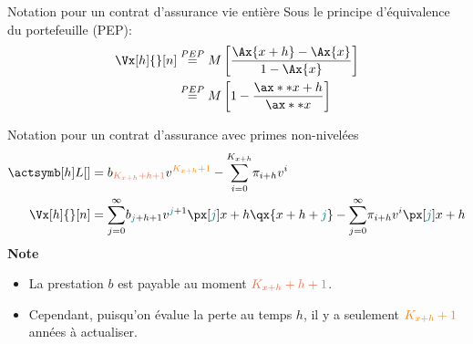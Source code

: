 \documentclass[10pt, french]{article}
\begin{document}
\begin{multicols*}{2}
\begin{examplebox}{Notation pour un contrat d'assurance vie entière}
Sous le principe d'équivalence du portefeuille (PEP):
\begin{align*}
	\Vx[h]{}[n]
	&\overset{PEP}{=}	M\left[\frac{\Ax{x + h} - \Ax{x}}{1 - \Ax{x}}\right]	\\
	&\overset{PEP}{=}	M\left[1 - \frac{\ax**{x + h}}{\ax**{x}}\right]	
\end{align*}
\end{examplebox}

\begin{examplebox}{Notation pour un contrat d'assurance avec primes non-nivelées}
\begin{align*}
	\LVx{h}
	&=	b_{\color{burntsienna}K_{x + h} + h + 1} v^{\color{orange}K_{x + h} + 1} - \sumz{K_{x + h}}{i = 0} \pi_{i + h} v^{i}	\\
	\Vx[h]{}[n]
	&=	\sumz{\infty}{j = 0} b_{\textcolor{teal}{j} + h + 1} v^{\textcolor{teal}{j} + 1} \px[\textcolor{teal}{j}]{x + h} \qx{x + h + \textcolor{teal}{j}} - \sumz{\infty}{j = 0} \pi_{i + h} v^{i} \px[\textcolor{teal}{j}]{x + h}
\end{align*}
	\textbf{Note}
\begin{itemize}[leftmargin = *]
	\item	La prestation $b$ est payable au moment ${\color{burntsienna}K_{x + h} + h + 1}$. 
	\item	Cependant, puisqu'on évalue la perte au temps $h$, il y a seulement ${\color{orange}K_{x + h} + 1}$ années à actualiser.
\end{itemize}
\end{examplebox}


\end{multicols*}
\end{document}
